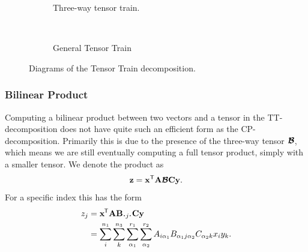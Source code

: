 \begin{figure}
	\centering
	\begin{subfigure}[t]{0.45\textwidth}
		\caption{Three-way tensor train.}
	\end{subfigure}~
	\begin{subfigure}[t]{0.45\textwidth}
		\caption{General Tensor Train}
	\end{subfigure}
	\caption{Diagrams of the Tensor Train decomposition.}
	\label{fig:tttnds}
\end{figure}

\subsubsection{Bilinear Product}
Computing a bilinear product between two vectors and a tensor in the TT-decomposition does not
have quite such an efficient form as the CP-decomposition. Primarily this is due to the presence
of the three-way tensor \(\bm{\mathcal{B}}\), which means we are still eventually computing a full
tensor product, simply with a smaller tensor. We denote the product as
\begin{equation} \label{eq:tt_bilin}
	\mathbf{z} = \mathbf{x}^\mathsf{T}\mathbf{A}\bm{\mathcal{B}}\mathbf{C}\mathbf{y}.
\end{equation} For a specific index this has the form
\begin{align} \label{eq:tt_bilin_index}
	z_j &= \tran{\vec{x}}\vec{A}\mat{B}_{\midbullet j \midbullet}\mat{C}\vec{y}\\
		&= \sum_{i}^{n_1}\sum_{k}^{n_3}
		\sum_{\alpha_1}^{r_1}
		\sum_{\alpha_2}^{r_2}A_{i\alpha_1}B_{\alpha_1j\alpha_2}C_{\alpha_2k}x_iy_k.
\end{align}

